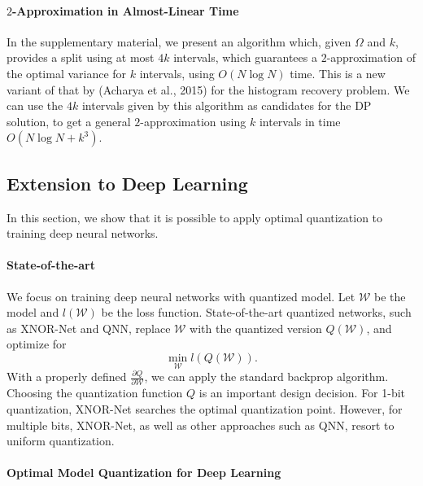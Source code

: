 \documentclass{article}
\begin{document}
\vspace{-0.5em}
\paragraph*{$2$-Approximation in Almost-Linear Time} 
In the supplementary material, we present an algorithm which, given $\Omega$ and $k$, provides a split using at most $4 k$ intervals, which guarantees a $2$-approximation of the optimal variance for $k$ intervals, using $O( N \log N )$ time. This 
is a new variant of that by (Acharya et al., 2015) for the histogram recovery problem. 
We can use the $4k$ intervals given by this algorithm as candidates for the DP solution, to get a general $2$-approximation using $k$ intervals in time $O( N \log N + k^3)$. 

\vspace{-1.0em}
\subsection{Extension to Deep Learning}
\vspace{-0.5em}

In this section, we show that it is possible 
to apply optimal quantization to
training deep neural networks.

\vspace{-0.5em}
\paragraph*{State-of-the-art} We focus on
training deep neural networks with quantized
model. Let $\mathcal{W}$ be the model and 
$l(\mathcal{W})$ be the loss function. State-of-the-art quantized networks,
such as XNOR-Net and QNN, replace $\mathcal{W}$
with the quantized version $Q(\mathcal{W})$, and optimize
for
\[
\min_{\mathcal{W}} l(Q(\mathcal{W})).
\]
With a properly defined 
$\frac{\partial Q}{\partial{\mathcal{W}}}$, we can
apply the standard backprop 
algorithm.
Choosing the quantization function $Q$ is
an important design decision. For 1-bit quantization,
XNOR-Net searches the optimal quantization point. However, for multiple bits,
XNOR-Net, as well as other approaches such as QNN, resort
to uniform quantization.

\vspace{-1.0em}
\paragraph*{Optimal Model Quantization for Deep Learning}
\end{document}
